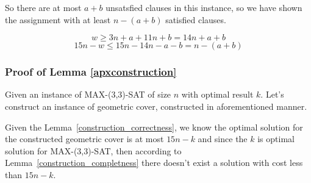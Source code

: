 So there are at most $a+b$ unsatsfied clauses in this instance,
so we have shown the assignment with at least  $n-(a+b)$ satisfied clauses.

$$w \ge 3n + a + 11n + b = 14n + a + b$$
$$15n - w  \le 15n - 14 n - a - b = n - (a+b)$$

\subsubsection{Proof of Lemma \ref{apxconstruction}}
Given an instance of MAX-(3,3)-SAT of size $n$
with optimal result $k$.
Let's construct an instance of geometric cover,
constructed in aforementioned manner.

Given the Lemma~\ref{construction_correctness}, we know
the optimal solution for the constructed geometric cover is
at most $15n - k$ and since the $k$ is optimal solution
for MAX-(3,3)-SAT, then according to Lemma~\ref{construction_completness}
there doesn't exist a solution with cost less than $15n - k$.
